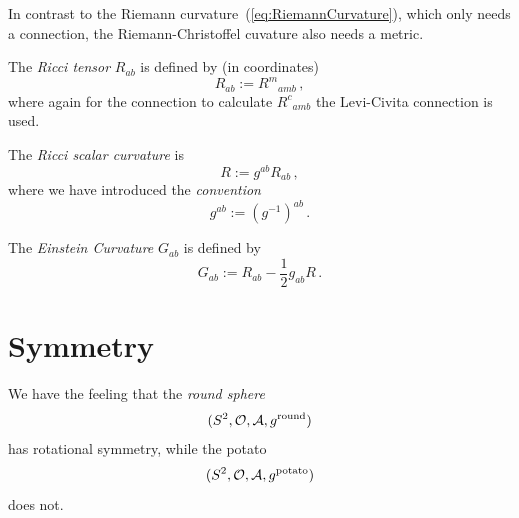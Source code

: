 \documentclass[11pt, a4paper, twocolumn]{article} %
\begin{document}
\begin{note}
    In contrast to the Riemann curvature~(\ref{eq:RiemannCurvature}), 
    which only needs a connection, the Riemann-Christoffel cuvature also needs a metric.
\end{note}
\begin{defn}
    The \textit{Ricci tensor} $R_{ab}$ is defined by (in coordinates)
    \begin{equation}
        R_{ab} := R^m{}_{amb}\,,
    \end{equation}
    where again for the connection to calculate $R^c{}_{amb}$ the Levi-Civita connection is used.
\end{defn}
\begin{defn}
    The \textit{Ricci scalar curvature} is
    \begin{equation}
        R := g^{ab}R_{ab}\,,
    \end{equation}
    where we have introduced the \textit{convention}
    \begin{equation}
        g^{ab} := (g^{-1})^{ab} \,.
    \end{equation}
\end{defn}
\begin{defn}
    The \textit{Einstein Curvature} $G_{ab}$ is defined by
    \begin{equation}
        G_{ab} := R_{ab} - \frac{1}{2} g_{ab} R\,.
    \end{equation}
\end{defn}

\section{Symmetry}
We have the feeling that the \textit{round sphere}
\begin{equation}
    (S^2, \mathcal{O}, \mathcal{A}, g^{\text{round}})
\end{equation}
has rotational symmetry, while the potato
\begin{equation}
    (S^2, \mathcal{O}, \mathcal{A}, g^{\text{potato}})
\end{equation}
does not.
\end{document}

